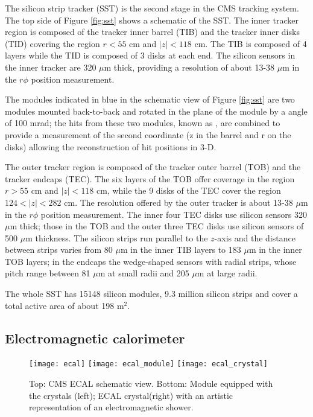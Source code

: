 The silicon strip tracker (SST) is the second stage in the CMS tracking system. The top side of Figure \ref{fig:sst} shows a schematic of the SST. The inner tracker region is composed of the tracker inner barrel (TIB) and the tracker inner disks (TID) covering the region $r<55$ cm and $|z|<118$ cm. The TIB is composed of 4 layers while the TID is composed of 3 disks at each end. The silicon sensors in the inner tracker are 320 $\mu$m thick, providing a resolution of about 13-38 $\mu$m in the $r\phi$ position measurement.

The modules indicated in blue in the schematic view of Figure \ref{fig:sst} are two modules mounted back-to-back and rotated in the plane of the module by a  angle of 100 mrad; the hits from these two modules, known as , are combined to provide a measurement of the second coordinate (z in the barrel and r on the disks) allowing the reconstruction of hit positions in 3-D.

The outer tracker region is composed of the tracker outer barrel (TOB) and the tracker endcaps (TEC). The six layers of the TOB offer coverage in the region $r>55$ cm and $|z|<118$ cm, while the 9 disks of the TEC cover the region $124<|z|<282$ cm. The resolution offered by the outer tracker is about 13-38 $\mu$m in the $r\phi$ position measurement. The inner four TEC disks use silicon sensors 320 $\mu$m thick; those in the TOB and the outer three TEC disks use silicon sensors of 500 $\mu$m thickness. The silicon strips run parallel to the $z$-axis and the distance between strips varies from 80 $\mu$m in the inner TIB layers to 183 $\mu$m in the inner TOB layers; in the endcaps the wedge-shaped sensors with radial strips, whose pitch range between 81 $\mu$m at small radii and 205 $\mu$m at large radii.

The whole SST has 15148 silicon modules, 9.3 million silicon strips and cover a total active area of about 198 m$^2$. 

\subsection{Electromagnetic calorimeter}
\begin{figure}[h!]
  \centering
  \texttt{[image: ecal]}
  \texttt{[image: ecal\_module]}
  \texttt{[image: ecal\_crystal]} 
  \caption[CMS ECAL schematic view]{Top: CMS ECAL schematic view. Bottom: Module equipped with the crystals (left); ECAL crystal(right) with an artistic representation of an electromagnetic shower\cite{cms}.}
  \label{fig:ecal}
\end{figure}

